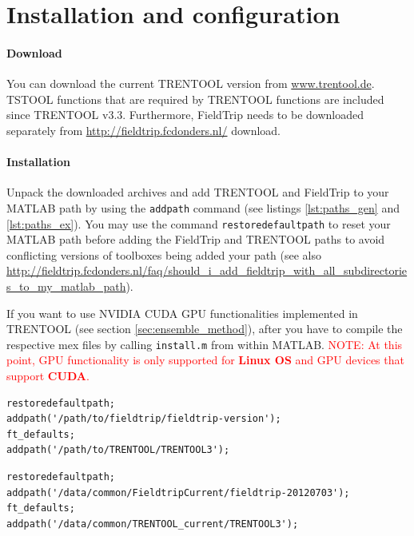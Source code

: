 \documentclass[a4paper,10pt]{article}
\begin{document}
\newpage
\section{Installation and configuration} \label{sec:installation}

\paragraph*{Download} You can download the current TRENTOOL version from \url{www.trentool.de}. TSTOOL functions that are required by TRENTOOL functions are included since TRENTOOL v3.3. Furthermore, FieldTrip needs to be downloaded separately from \url{http://fieldtrip.fcdonders.nl/} download.

\paragraph*{Installation} Unpack the downloaded archives and add TRENTOOL and FieldTrip to your MATLAB path by using the \verb&addpath& command (see listings \ref{lst:paths_gen} and \ref{lst:paths_ex}). You may use the command \verb&restoredefaultpath& to reset your MATLAB path before adding the FieldTrip and TRENTOOL paths to avoid conflicting versions of toolboxes being added your path (see also \url{http://fieldtrip.fcdonders.nl/faq/should_i_add_fieldtrip_with_all_subdirectories_to_my_matlab_path}). %

If you want to use NVIDIA CUDA GPU functionalities implemented in TRENTOOL (see section \ref{sec:ensemble_method}), after you have to compile the respective mex files by calling \texttt{install.m} from within MATLAB. \textcolor{red}{NOTE: At this point, GPU functionality is only supported for \textbf{Linux OS} and GPU devices that support \textbf{CUDA}.}

\begin{lstlisting}
restoredefaultpath;
addpath('/path/to/fieldtrip/fieldtrip-version');
ft_defaults;
addpath('/path/to/TRENTOOL/TRENTOOL3');
\end{lstlisting}

\begin{lstlisting}
restoredefaultpath;
addpath('/data/common/FieldtripCurrent/fieldtrip-20120703');
ft_defaults;
addpath('/data/common/TRENTOOL_current/TRENTOOL3');
\end{lstlisting}
\end{document}

